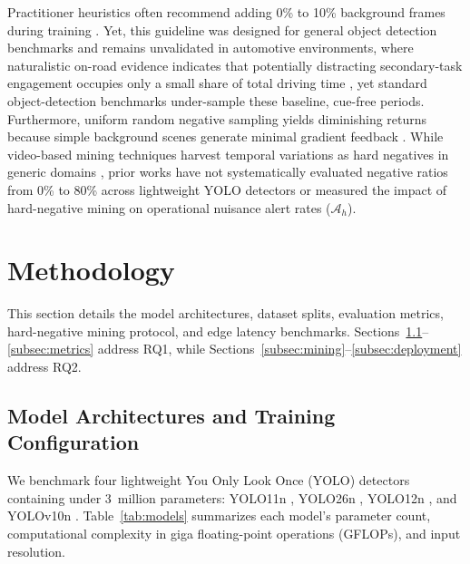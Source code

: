 \documentclass[conference]{IEEEtran}
\begin{document}
Practitioner heuristics often recommend adding 0\% to 10\% background frames during training \cite{ultralytics2023guidelines}. Yet, this guideline was designed for general object detection benchmarks and remains unvalidated in automotive environments, where naturalistic on-road evidence indicates that potentially distracting secondary-task engagement occupies only a small share of total driving time \cite{stutts2005}, yet standard object-detection benchmarks under-sample these baseline, cue-free periods. Furthermore, uniform random negative sampling yields diminishing returns because simple background scenes generate minimal gradient feedback \cite{shrivastava2016ohem, jin2018video}. While video-based mining techniques harvest temporal variations as hard negatives in generic domains \cite{jin2018video}, prior works have not systematically evaluated negative ratios from 0\% to 80\% across lightweight YOLO detectors or measured the impact of hard-negative mining on operational nuisance alert rates ($\mathcal{A}_h$).
\section{Methodology}
\label{sec:methodology}
This section details the model architectures, dataset splits, evaluation metrics, hard-negative mining protocol, and edge latency benchmarks. Sections~\ref{subsec:arch}--\ref{subsec:metrics} address RQ1, while Sections~\ref{subsec:mining}--\ref{subsec:deployment} address RQ2.

\subsection{Model Architectures and Training Configuration}
\label{subsec:arch}
We benchmark four lightweight You Only Look Once (YOLO) detectors containing under 3~million parameters: YOLO11n \cite{khanam2024yolov11}, YOLO26n \cite{jocher2026yolo26}, YOLO12n \cite{tian2025yolov12}, and YOLOv10n \cite{wang2024yolov10}. Table~\ref{tab:models} summarizes each model's parameter count, computational complexity in giga floating-point operations (GFLOPs), and input resolution.
\end{document}
